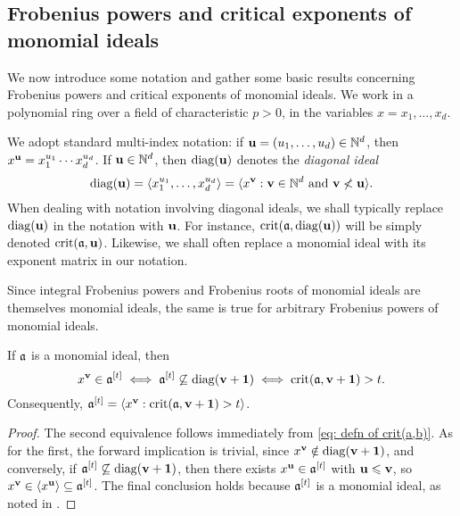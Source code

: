 \documentclass[11pt]{amsart}
\begin{document}
\subsection{Frobenius powers and critical exponents of monomial ideals}

We now introduce some notation and gather some basic results concerning Frobenius powers and critical exponents of monomial ideals.
We work in a polynomial ring over a field of characteristic $p>0$, in the variables $x=x_1,\ldots,x_d$.

\begin{notation}
   We adopt standard multi-index notation: if $\mathbf{u} = (u_1,\ldots,u_d)\in \mathbb{N}^d$, then $x^{\mathbf{u}} = x_1^{u_1}\cdots x_d^{u_d}$.   If $\mathbf{u}\in \mathbb{N}^d$, then $\operatorname{diag}(\mathbf{u})$ denotes the \emph{diagonal ideal} 
   \[ \operatorname{diag}(\mathbf{u}) = \langle x_1^{u_1},\ldots,x_d^{u_d} \rangle = \langle x^{\mathbf{v}} : \mathbf{v} \in \mathbb{N}^d \text{ and } \mathbf{v} \not < \mathbf{u} \rangle.\]
   When dealing with notation involving diagonal ideals, we shall typically replace $\operatorname{diag}(\mathbf{u})$ in the notation with $\mathbf{u}$.
   For instance, $\operatorname{crit}(\mathfrak{a},\operatorname{diag}(\mathbf{u}))$ will be simply denoted $\operatorname{crit}(\mathfrak{a},\mathbf{u})$.   
   Likewise, we shall often replace a monomial ideal with its exponent matrix in our notation.
\end{notation}

\begin{remark}\label{rmk: Frobenius powers of monomial ideals are monomial ideals}
   Since integral Frobenius powers and Frobenius roots of monomial ideals are themselves monomial ideals, the same is true for arbitrary Frobenius powers of monomial ideals. 
\end{remark}

\begin{proposition}\label{prop: description of frobenius powers in terms of crits}
   If $\mathfrak{a}$ is a monomial ideal, then
   \[ x^{\mathbf{v}} \in \mathfrak{a}^{[t]} \iff \mathfrak{a}^{[t]} \not \subseteq \operatorname{diag}(\mathbf{v}+\mathbf{1}) \iff \operatorname{crit}(\mathfrak{a}, \mathbf{v}+\mathbf{1}) > t.\]
   Consequently, $\mathfrak{a}^{[t]} = \langle x^{\mathbf{v}} : \operatorname{crit}(\mathfrak{a}, \mathbf{v}+\mathbf{1}) > t \rangle$.
\end{proposition}

\begin{proof}
   The second equivalence follows immediately from \eqref{eq: defn of crit(a,b)}.
   As for the first, the forward implication is trivial, since $x^{\mathbf{v}} \notin\operatorname{diag}(\mathbf{v}+\mathbf{1})$, and conversely, if $\mathfrak{a}^{[t]} \not \subseteq \operatorname{diag}(\mathbf{v}+\mathbf{1})$, then there exists $x^{\mathbf{u}} \in \mathfrak{a}^{[t]}$ with $\mathbf{u} \leqslant \mathbf{v}$, so $x^{\mathbf{v}}\in \langle x^{\mathbf{u}} \rangle \subseteq \mathfrak{a}^{[t]}$.
   The final conclusion holds because $\mathfrak{a}^{[t]}$ is a monomial ideal, as noted in .
\end{proof}
\end{document}

